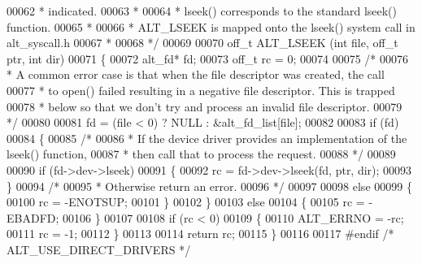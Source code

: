 \begin{DoxyCode}
00062 \textcolor{comment}{ * indicated.}
00063 \textcolor{comment}{ *}
00064 \textcolor{comment}{ * lseek() corresponds to the standard lseek() function.}
00065 \textcolor{comment}{ *}
00066 \textcolor{comment}{ * ALT\_LSEEK is mapped onto the lseek() system call in alt\_syscall.h}
00067 \textcolor{comment}{ *}
00068 \textcolor{comment}{ */}
00069 
00070 off\_t ALT_LSEEK (\textcolor{keywordtype}{int} file, off\_t ptr, \textcolor{keywordtype}{int} dir)
00071 \{
00072   alt_fd* fd;
00073   off\_t   rc = 0; 
00074 
00075   \textcolor{comment}{/*}
00076 \textcolor{comment}{   * A common error case is that when the file descriptor was created, the call}
00077 \textcolor{comment}{   * to open() failed resulting in a negative file descriptor. This is trapped}
00078 \textcolor{comment}{   * below so that we don't try and process an invalid file descriptor.}
00079 \textcolor{comment}{   */}
00080 
00081   fd = (file < 0) ? NULL : &alt_fd_list[file];
00082   
00083   \textcolor{keywordflow}{if} (fd) 
00084   \{
00085     \textcolor{comment}{/*}
00086 \textcolor{comment}{     * If the device driver provides an implementation of the lseek() function,}
00087 \textcolor{comment}{     * then call that to process the request.}
00088 \textcolor{comment}{     */}
00089  
00090     \textcolor{keywordflow}{if} (fd->dev->lseek)
00091     \{
00092       rc = fd->dev->lseek(fd, ptr, dir);
00093     \}
00094     \textcolor{comment}{/*}
00095 \textcolor{comment}{     * Otherwise return an error.}
00096 \textcolor{comment}{     */}
00097 
00098     \textcolor{keywordflow}{else}
00099     \{
00100       rc = -ENOTSUP;
00101     \}
00102   \}
00103   \textcolor{keywordflow}{else}  
00104   \{
00105     rc = -EBADFD;
00106   \}
00107 
00108   \textcolor{keywordflow}{if} (rc < 0)
00109   \{
00110     ALT_ERRNO = -rc;
00111     rc = -1;
00112   \}
00113 
00114   \textcolor{keywordflow}{return} rc;
00115 \}
00116 
00117 \textcolor{preprocessor}{#endif }\textcolor{comment}{/* ALT\_USE\_DIRECT\_DRIVERS */}\textcolor{preprocessor}{}
\end{DoxyCode}
